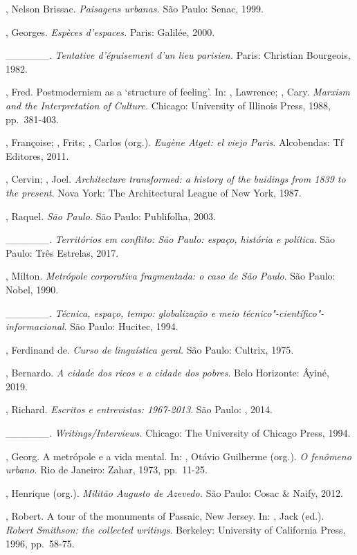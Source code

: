 \begin{Parskip}
, Nelson Brissac. \emph{Paisagens urbanas.} São Paulo: Senac, 1999.

, Georges. \emph{Espèces d'espaces.} Paris: Galilée, 2000.

\_\_\_\_\_\_. \emph{Tentative d'épuisement d'un lieu parisien.}
Paris: Christian Bourgeois, 1982.

, Fred. Postmodernism as a `structure of feeling'. In: ,
Lawrence; , Cary. \emph{Marxism and the Interpretation of
Culture.} Chicago: University of Illinois Press, 1988, pp.~381-403.

, Françoise; , Frits; , Carlos (org.).
\emph{Eugène Atget: el viejo Paris}. Alcobendas: Tf Editores, 2011.

, Cervin; , Joel. \emph{Architecture transformed: a
history of the buidings from 1839 to the present}. Nova York: The
Architectural League of New York, 1987.

, Raquel. \emph{São Paulo.} São Paulo: Publifolha, 2003.

\_\_\_\_\_\_. \emph{Territórios em conflito: São Paulo: espaço,
história e política}. São Paulo: Três Estrelas, 2017.

, Milton. \emph{Metrópole corporativa fragmentada: o caso de
São Paulo}. São Paulo: Nobel, 1990.

\_\_\_\_\_\_. \emph{Técnica, espaço, tempo: globalização e meio
técnico"-científico"-informacional}. São Paulo: Hucitec, 1994.

, Ferdinand de. \emph{Curso de linguística geral.} São Paulo:
Cultrix, 1975.

, Bernardo. \emph{A cidade dos ricos e a cidade dos pobres}. Belo Horizonte: Âyiné, 2019.

, Richard. \emph{Escritos e entrevistas: 1967-2013}. São Paulo:
, 2014.

\_\_\_\_\_\_. \emph{Writings/Interviews.} Chicago: The University
of Chicago Press, 1994.

, Georg. A metrópole e a vida mental. In: , Otávio Guilherme
(org.). \emph{O fenômeno urbano.} Rio de Janeiro: Zahar, 1973, pp.~11-25.

, Henrique (org.). \emph{Militão Augusto de Azevedo.} São
Paulo: Cosac \& Naify, 2012.

, Robert. A tour of the monuments of Passaic, New Jersey. In:
, Jack (ed.). \emph{Robert Smithson: the collected writings}.
Berkeley: University of California Press, 1996, pp.~58-75.


\end{Parskip}
